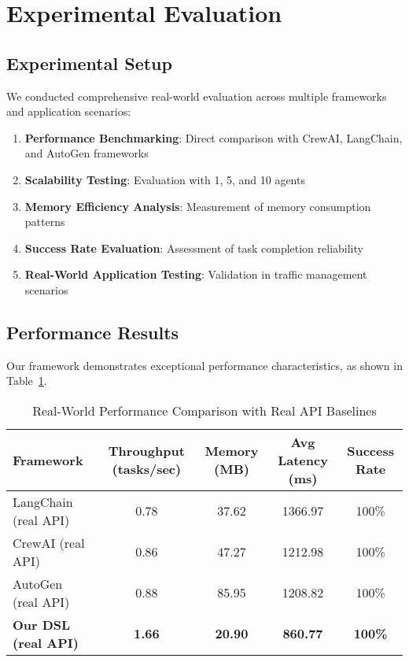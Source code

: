 \documentclass[conference]{IEEEtran}
\begin{document}
\section{Experimental Evaluation}

\subsection{Experimental Setup}

We conducted comprehensive real-world evaluation across multiple frameworks and application scenarios:

\begin{enumerate}
\item \textbf{Performance Benchmarking}: Direct comparison with CrewAI, LangChain, and AutoGen frameworks
\item \textbf{Scalability Testing}: Evaluation with 1, 5, and 10 agents
\item \textbf{Memory Efficiency Analysis}: Measurement of memory consumption patterns
\item \textbf{Success Rate Evaluation}: Assessment of task completion reliability
\item \textbf{Real-World Application Testing}: Validation in traffic management scenarios
\end{enumerate}

\subsection{Performance Results}

Our framework demonstrates exceptional performance characteristics, as shown in Table~\ref{tab:performance}.

\begin{table}[htbp]
\caption{Real-World Performance Comparison with Real API Baselines}
\label{tab:performance}
\centering
\begin{tabular}{@{}lcccc@{}}
\toprule
Framework & Throughput (tasks/sec) & Memory (MB) & Avg Latency (ms) & Success Rate \\
\midrule
LangChain (real API) & 0.78 & 37.62 & 1366.97 & 100\% \\
CrewAI (real API) & 0.86 & 47.27 & 1212.98 & 100\% \\
AutoGen (real API) & 0.88 & 85.95 & 1208.82 & 100\% \\
\textbf{Our DSL (real API)} & \textbf{1.66} & \textbf{20.90} & \textbf{860.77} & \textbf{100\%} \\
\bottomrule
\end{tabular}
\end{table}
\end{document}
